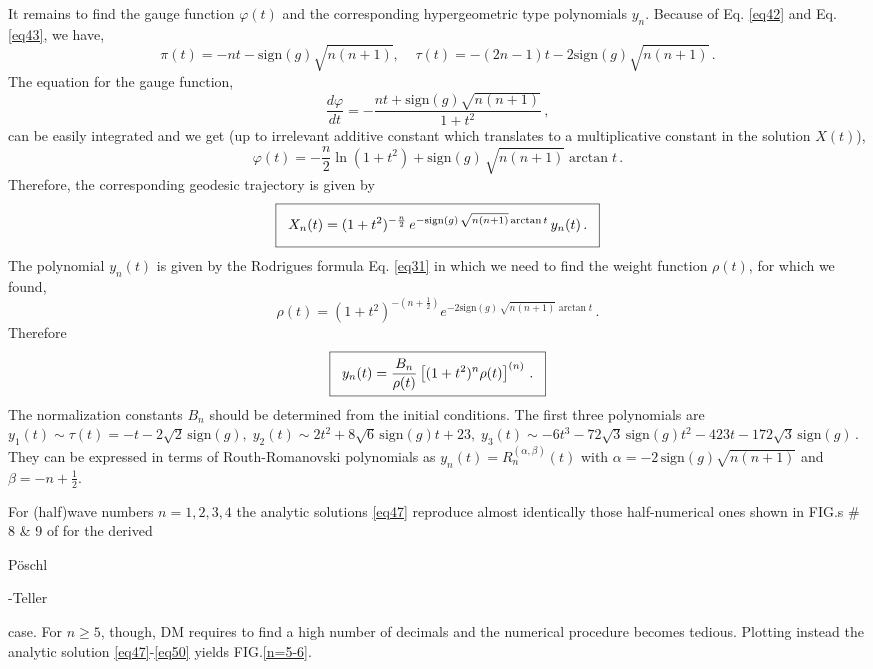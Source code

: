 \documentclass[preprint,showpacs,preprintnumbers,amsmath,amssymb,nofootinbib]{revtex4}
\newcommand{\PT}{{P\"oschl{\strut}-Teller\;}}
\newcommand{\sign}{\mathrm{sign}}
\newcommand{\medbox}[1]{\fbox{%
\rule[-10pt]{0pt}{25pt}$\;\;\displaystyle{#1}\;\;$}%
}
\begin{document}
It remains to find the gauge function $\varphi(t)$ and the corresponding hypergeometric type polynomials $y_n$. Because of Eq. \eqref{eq42} and Eq. \eqref{eq43}, we have,
\begin{equation}
\pi(t)=-nt-\sign(g)\sqrt{n(n+1)}, \;\;\;\; \tau(t)=-(2n-1)t-2\sign(g)\sqrt{n(n+1)}\,.
\label{eq44}
\end{equation}
The equation for the gauge function,
\begin{equation}
\frac{d\varphi}{dt}= -\frac{nt+\sign(g)\sqrt{n(n+1)}}{1+t^2}\,,
\label{eq45}
\end{equation}
can be easily integrated and we get (up to irrelevant additive constant which translates to a multiplicative constant in the solution $X(t)$),
\begin{equation}
\varphi(t)=-\frac{n}{2}\ln(1+t^2)+\sign(g)\,\sqrt{n(n+1)}\arctan{t}\,.
\label{eq46}
\end{equation}
Therefore, the corresponding geodesic trajectory is given by
\begin{equation}
\medbox{
X_n(t)=(1+t^2)^{-\frac{n}{2}}\,e^{-\sign(g)\,\sqrt{n(n+1)}\arctan{t}}\, y_n(t)\,.
}
\label{eq47}
\end{equation}
The polynomial $y_n(t)$ is given by the Rodrigues formula Eq. \eqref{eq31} in which we need to find the weight function $\rho(t)$, for which we found,
\begin{equation}
\rho(t)=(1+t^2)^{-\left(n+\frac{1}{2}\right)} e^{-2\sign(g)\,\sqrt{n(n+1)}\arctan{t}}\,.
\label{eq49}
\end{equation}
Therefore
\begin{equation}
\medbox{
y_n(t)=\frac{B_n}{\rho(t)}\left [(1+t^2)^n\rho(t)\right]^{(n)}\,.}
\label{eq50}
\end{equation}
The normalization constants $B_n$ should be determined from the initial conditions. 
The first three polynomials are
$
y_1(t)\sim \tau(t)=-t-2\sqrt{2}\,\sign(g),
\; y_2(t)\sim 2t^2+8\sqrt{6}\,\sign(g) t+23, 
\;y_3(t)\sim -6t^3-72\sqrt{3}\,\sign(g)t^2-423t-172\sqrt{3}\,\sign(g)\,.
$ 
They can be expressed in terms of Routh-Romanovski polynomials \cite{scarfpot,Raposo} as $y_n(t)=R_n^{(\alpha,\beta)}(t)$ with $\alpha=-2\,\sign(g)\sqrt{n(n+1)}$ and $\beta=-n+\frac{1}{2}$.

For (half)wave numbers $n=1,2,3,4$  the analytic solutions \eqref{eq47} reproduce almost identically those half-numerical ones shown in FIG.s \# 8 \& 9 of \cite{DM-2} for the derived \PT case. For $n\geq5$, though,  DM requires to find a high number of decimals and the numerical procedure becomes tedious. Plotting instead the analytic solution \eqref{eq47}-\eqref{eq50} yields FIG.\ref{n=5-6}. 
\end{document}
